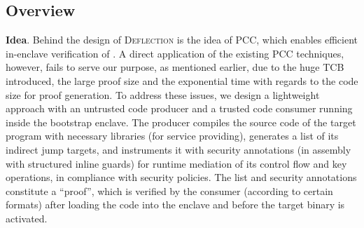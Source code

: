 





\subsection{Overview}
\label{subsec-overview}

\noindent\textbf{Idea}. Behind the design of \textsc{Deflection} is the idea of PCC, which enables efficient in-enclave verification of . A direct application of the existing PCC techniques, however, fails to serve our purpose, as mentioned earlier, due to the huge TCB introduced, the large proof size and the exponential time with regards to the code size for proof generation. To address these issues, we design a lightweight 
approach with an untrusted code producer and a trusted code consumer running inside the bootstrap enclave. The producer compiles the source code of the target program with necessary libraries (for service providing), generates a list of its indirect jump targets, and instruments it with security annotations (in assembly with structured inline guards) for runtime mediation of its control flow and key operations, in compliance with security policies. The list and security annotations constitute a ``proof'', which is verified by the consumer (according to certain formats) after loading the code into the enclave and before the target binary is activated. 
\DIFaddbegin 

